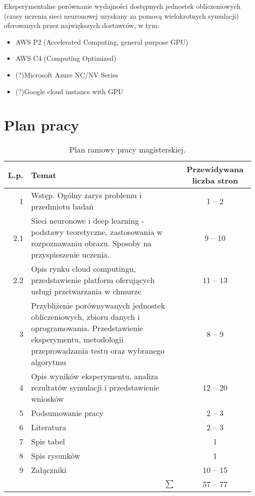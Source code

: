 \documentclass[12pt,a4paper,twoside]{article}
\begin{document}
Eksperymentalne porównanie wydajności dostępnych jednostek obliczeniowych (czasy uczenia sieci neuronowej uzyskany za pomocą wielokrotnych symulacji) oferowanych przez największych dostawców, w tym:
\begin{itemize}
\item AWS P2 (Accelerated Computing, general purpose GPU)
\item AWS C4 (Computing Optimized)
\item (?)Microsoft Azure NC/NV Series
\item (?)Google cloud instance with GPU

\end{itemize}


\section{Plan pracy}

\begin{table}[h]
\centering
\caption{Plan ramowy pracy magisterskiej.}
\label{tab:planramowy}
\footnotesize
\begin{tabulary}{1.0\textwidth}{rLC}
\toprule
L.p. & Temat & Przewidywana liczba stron\\
 & Wstęp. Ogólny zarys problemu i przedmiotu badań & 1 -- 2 \\
2.1 & Sieci neuronowe i deep learning - podstawy teoretyczne, zastosowania w rozpoznawaniu obrazu. Sposoby na przyspieszenie uczenia. & 9 -- 10 \\
2.2 & Opis rynku cloud computingu, przedstawienie platform oferujących usługi przetwarzania w chmurze & 11 -- 13 \\
3 & Przybliżenie porównywanych jednostek obliczeniowych, zbioru danych i oprogramowania.
Przedstawienie eksperymentu, metodologii przeprowadzania testu oraz wybranego algorytmu & 8 -- 9 \\
4 & Opis wyników eksperymentu, analiza rezultatów symulacji i przedstawienie wniosków & 12 -- 20 \\
5 & Podsumowanie pracy & 2 -- 3 \\
6 & Literatura & 2 -- 3 \\
7 & Spis tabel & 1 \\
8 & Spis rysunków & 1 \\
9 & Załączniki & 10 -- 15 \\
\hline
{} & 57 -- 77 \\

\hline
\end{tabulary}
\end{table}

\clearpage
\end{document}

